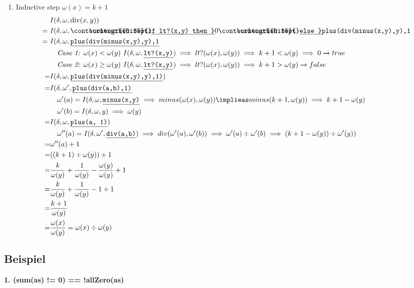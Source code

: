 \documentclass[10pt, a4paper]{article}
\newcounter{bsp}
\newcommand{\task}{\stepcounter{bsp}\subsection*{Beispiel \arabic{bsp}}}
\newcommand{\ul}[1]{%
  \begingroup%
  \renewcommand{\ULdepth}{2.1pt}%
  \contourlength{0.35pt}%
  \uline{\phantom{#1}}\llap{\contour{white}{#1}}%
  \endgroup%
}
\newcommand{\Prog}[1]{\texttt{\ul{#1}}}
\newcommand{\ifThenElse}[3]{\Prog{if #1 then } #2 \Prog{ else } #3}
\begin{document}
\begin{enumerate}
\item Inductive step $\omega(x)=k+1$
\begin{align*}
  & I(\delta, \omega, \text{div}(x, y)) \\
    = \ & I(\delta, \omega, \ifThenElse{lt?(x,y)}{0}\texttt{plus(div(minus(x,y),y),1}\\ 
    = \ & I(\delta, \omega, \underline{\texttt{plus(div(minus(x,y),y),1}}\\
    & \quad \textit{Case 1: $ \omega(x) < \omega(y)$ } I(\delta, \omega, \underline{\texttt{lt?(x,y)}}) \implies lt?(\omega(x), \omega(y)) \implies k + 1 < \omega(y) \implies 0 \xrightarrow{} true \\
    & \quad \textit{Case 2: $\omega(x) \geq \omega(y)$ } I(\delta, \omega, \underline{\texttt{lt?(x,y)}}) \implies lt?(\omega(x), \omega(y)) \implies k+1>\omega(y) \xrightarrow{} false \\
= & I(\delta, \omega, \underline{\texttt{plus(div(minus(x,y),y),1)}}) \\
= & I(\delta, \omega', \underline{\texttt{plus(div(a,b),1)}} \\
& \quad \omega'(a) = I(\delta, \omega, \underline{\texttt{minus(x,y)}} \implies minus(\omega(x), \omega(y)) \implieas minus(k+1, \omega(y)) \implies k + 1 - \omega(y) \\
& \quad \omega'(b) = I(\delta, \omega, y) \implies \omega(y) \\
= & I(\delta, \omega, \underline{\texttt{plus(a, 1)}}) \\
& \quad \omega''(a) = I(\delta, \omega', \underline{\texttt{div(a,b)}}) \implies div(\omega'(a), \omega'(b)) \implies \omega'(a) \div \omega'(b) \implies (k+1 - \omega(y)) \div \omega'(y)) \\
= & \omega''(a) + 1 \\
= & ((k+1) \div \omega(y)) + 1 \\
= & \frac{k}{\omega(y)} + \frac{1}{\omega(y)} - \frac{\omega(y)}{\omega(y)} + 1 \\
= & \frac{k}{\omega(y)} + \frac{1}{\omega(y)} - 1 + 1 \\
= & \frac{k+1}{\omega(y)} \\
= & \frac{\omega(x)}{\omega(y)} = \omega(x) \div \omega(y)
\end{align*}
\end{enumerate}

\task
\begin{center}
\textbf{1. (sum(as) != 0) == !allZero(as)}
\end{center}
\end{document}
